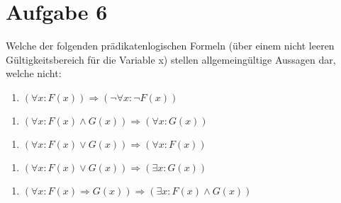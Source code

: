 \section*{Aufgabe 6}

Welche der folgenden prädikatenlogischen Formeln (über einem nicht leeren Gültigkeitsbereich für die Variable x) stellen allgemeingültige Aussagen dar, welche nicht:

\begin{enumerate}[label={a)}, leftmargin=*]
\item $(\forall x : F(x)) \Rightarrow (\lnot \forall x : \lnot F(x))$
\end{enumerate}

\begin{enumerate}[label={b)}, leftmargin=*]
\item $(\forall x : F(x) \land G(x)) \Rightarrow (\forall x : G(x))$
\end{enumerate}

\begin{enumerate}[label={c)}, leftmargin=*]
\item $(\forall x : F(x) \lor G(x)) \Rightarrow (\forall x : F(x))$
\end{enumerate}

\begin{enumerate}[label={d)}, leftmargin=*]
\item $(\forall x : F(x) \lor G(x)) \Rightarrow (\exists x : G(x))$
\end{enumerate}

\begin{enumerate}[label={e)}, leftmargin=*]
\item $(\forall x : F(x) \Rightarrow G(x)) \Rightarrow (\exists x : F(x) \land G(x))$
\end{enumerate}